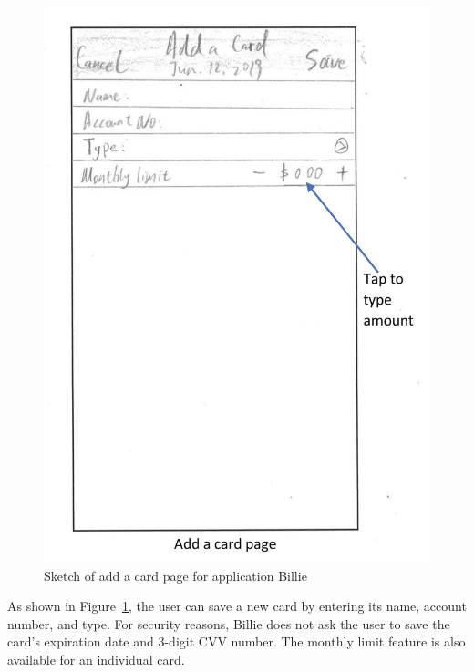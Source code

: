 \documentclass{sigchi}
\begin{document}
\begin{figure}[h!]
\centering
  \includegraphics[width=0.6\columnwidth]{21-add-card-page.jpg}
  \caption{Sketch of add a card page for application Billie}
  \label{fig:figure36}
\end{figure}
As shown in Figure~\ref{fig:figure36}, the user can save a new card by entering its name, account number, and type. For security reasons, Billie does not ask the user to save the card's expiration date and 3-digit CVV number. The monthly limit feature is also available for an individual card.
\end{document}
